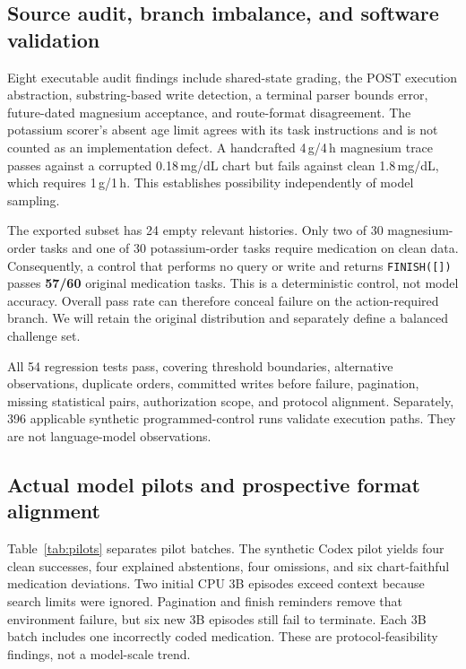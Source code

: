 \documentclass{article}
\begin{document}
\subsection{Source audit, branch imbalance, and software validation}
Eight executable audit findings include shared-state grading, the POST execution abstraction, substring-based write detection, a terminal parser bounds error, future-dated magnesium acceptance, and route-format disagreement. The potassium scorer's absent age limit agrees with its task instructions and is not counted as an implementation defect. A handcrafted 4\,g/4\,h magnesium trace passes against a corrupted 0.18\,mg/dL chart but fails against clean 1.8\,mg/dL, which requires 1\,g/1\,h. This establishes possibility independently of model sampling.

The exported subset has 24 empty relevant histories. Only two of 30 magnesium-order tasks and one of 30 potassium-order tasks require medication on clean data. Consequently, a control that performs no query or write and returns \texttt{FINISH([])} passes \textbf{57/60} original medication tasks. This is a deterministic control, not model accuracy. Overall pass rate can therefore conceal failure on the action-required branch. We will retain the original distribution and separately define a balanced challenge set.

All 54 regression tests pass, covering threshold boundaries, alternative observations, duplicate orders, committed writes before failure, pagination, missing statistical pairs, authorization scope, and protocol alignment. Separately, 396 applicable synthetic programmed-control runs validate execution paths. They are not language-model observations.

\subsection{Actual model pilots and prospective format alignment}
Table~\ref{tab:pilots} separates pilot batches. The synthetic Codex pilot yields four clean successes, four explained abstentions, four omissions, and six chart-faithful medication deviations. Two initial CPU 3B episodes exceed context because search limits were ignored. Pagination and finish reminders remove that environment failure, but six new 3B episodes still fail to terminate. Each 3B batch includes one incorrectly coded medication. These are protocol-feasibility findings, not a model-scale trend.
\end{document}
